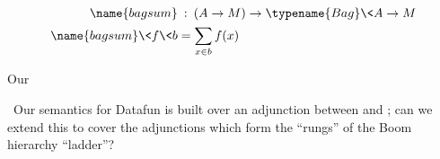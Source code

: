 \begin{align*}
  \name{bagsum} &\isa (A \to M) \to \typename{Bag}\<A \to M\\
  \name{bagsum} \<f \<b &= \sum_{x \in b} f(x)
\end{align*}

\noindent
Our

\XXX\
Our semantics for Datafun is built over an adjunction between  and ; can we extend this to cover the adjunctions which form the ``rungs'' of the Boom hierarchy ``ladder''?


\XXX






